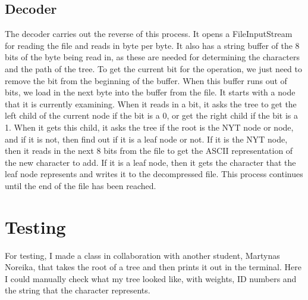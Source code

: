 \documentclass[12pt, letterpaper]{article}
\begin{document}
\subsection{Decoder}
The decoder carries out the reverse of this process. It opens a FileInputStream for reading the file and reads in byte per byte. It also has a string buffer of the 8 bits of the byte being read in, as these are needed for determining the characters and the path of the tree. To get the current bit for the operation, we just need to remove the bit from the beginning of the buffer. When this buffer runs out of bits, we load in the next byte into the buffer from the file.
\newline \newline
It starts with a node that it is currently examining. When it reads in a bit, it asks the tree to get the left child of the current node if the bit is a 0, or get the right child if the bit is a 1. When it gets this child, it asks the tree if the root is the NYT node or node, and if it is not, then find out if it is a leaf node or not. If it is the NYT node, then it reads in the next 8 bits from the file to get the ASCII representation of the new character to add. If it is a leaf node, then it gets the character that the leaf node represents and writes it to the decompressed file. This process continues until the end of the file has been reached.
\section{Testing}
For testing, I made a class in collaboration with another student, Martynas Noreika, that takes the root of a tree and then prints it out in the terminal. Here I could manually check what my tree looked like, with weights, ID numbers and the string that the character represents.
\end{document}
